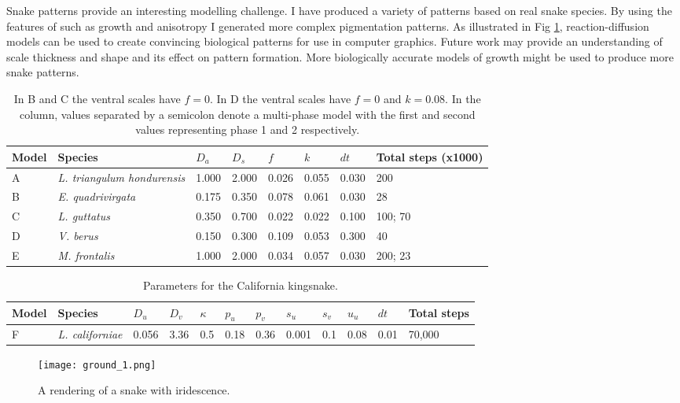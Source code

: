 Snake patterns provide an interesting modelling challenge. I have produced a variety of patterns based on real snake species. By using the features of \ProgramName{} such as growth and anisotropy I generated more complex pigmentation patterns. As illustrated in Fig \ref{fig:SnakeRendering}, reaction-diffusion models can be used to create convincing biological patterns for use in computer graphics. Future work may provide an understanding of scale thickness and shape and its effect on pattern formation. More biologically accurate models of growth might be used to produce more snake patterns.

\begin{table}[h]
	\centering
	\begin{tabular}{|l|l|l|l|l|l|l|l|}
	\hline
	Model & Species                      &$D_a$ &$D_s$ &$f$    &$k$   &$dt$ &Total steps (x1000)\\ \hline 
	A     &\textit{L. triangulum hondurensis} &1.000 &2.000 &0.026 &0.055 &0.030 &200                \\ \hline
	B     &\textit{E. quadrivirgata}     &0.175 &0.350 &0.078 &0.061 &0.030 &28                 \\ \hline
	C     &\textit{L. guttatus}          &0.350 &0.700 &0.022 &0.022 &0.100 &100; 70            \\ \hline
	D     &\textit{V. berus}             &0.150 &0.300 &0.109 &0.053 &0.300 &40                 \\ \hline
	E     &\textit{M. frontalis}         &1.000 &2.000 &0.034 &0.057 &0.030 &200; 23            \\ \hline
	\end{tabular}
	\caption {In B and C the ventral scales have $f=0$. In D the ventral scales have $f=0$ and $k=0.08$. In the  column, values separated by a semicolon denote a multi-phase model with the first and second values representing phase 1 and 2 respectively.}
	\label{tab:gsSnakeParameters}
\end{table}

\begin{table}[h]
	\centering
	\begin{tabular}{|l|l|l|l|l|l|l|l|l|l|l|l|}
	\hline
	Model & Species &$D_u$ &$D_v$ &$\kappa$ &$p_u$ &$p_v$ &$s_u$ &$s_v$  &$u_u$ &$dt$ &Total steps\\ \hline 
	F     &\textit{L. californiae} &0.056 &3.36 &0.5 &0.18 &0.36 &0.001 &0.1 &0.08 &0.01 &70,000                \\ \hline
	\end{tabular}
	\caption {Parameters for the California kingsnake.}
	\label{tab:snakeParameters}
\end{table}

\begin{figure}[p]
	\centering
	\texttt{[image: ground\_1.png]}
	\caption{A rendering of a snake with iridescence.}
	\label{fig:SnakeRendering}
\end{figure}